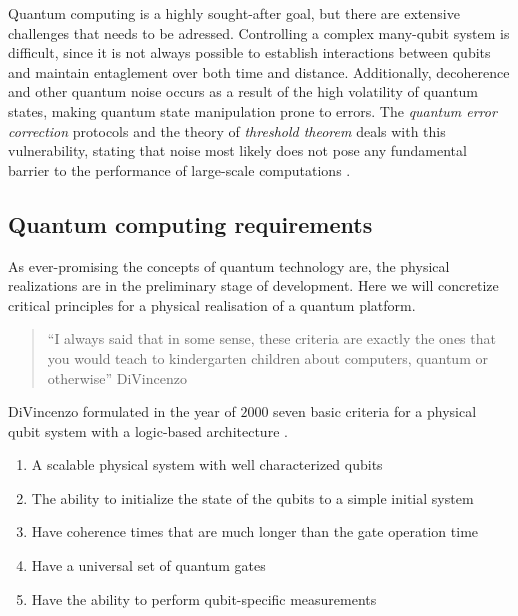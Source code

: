 
Quantum computing is a highly sought-after goal, but there are extensive challenges that needs to be adressed. Controlling a complex many-qubit system is difficult, since it is not always possible to establish interactions between qubits \cite{DiVincenzo2000} and maintain entaglement over both time and distance. Additionally, decoherence and other quantum noise occurs as a result of the high volatility of quantum states, making quantum state manipulation prone to errors. The \textit{quantum error correction} protocols and the theory of \textit{threshold theorem} deals with this vulnerability, stating that noise most likely does not pose any fundamental barrier to the performance of large-scale computations \cite{Pavicic2006}.


\subsection{Quantum computing requirements}
As ever-promising the concepts of quantum technology are, the physical realizations are in the preliminary stage of development. Here we will concretize critical principles for a physical realisation of a quantum platform.

\begin{quote}
   ``I always said that in some sense, these criteria are exactly the ones that you would teach to kindergarten children about computers, quantum or otherwise'' DiVincenzo \cite{Georgescu2020}
\end{quote}

\noindent DiVincenzo formulated in the year of $2000$ seven basic criteria for a physical qubit system with a logic-based architecture \cite{DiVincenzo2000}.

\begin{enumerate}
  \item A scalable physical system with well characterized qubits
  \item The ability to initialize the state of the qubits to a simple initial system
  \item Have coherence times that are much longer than the gate operation time
  \item Have a universal set of quantum gates
  \item Have the ability to perform qubit-specific measurements
\end{enumerate}


